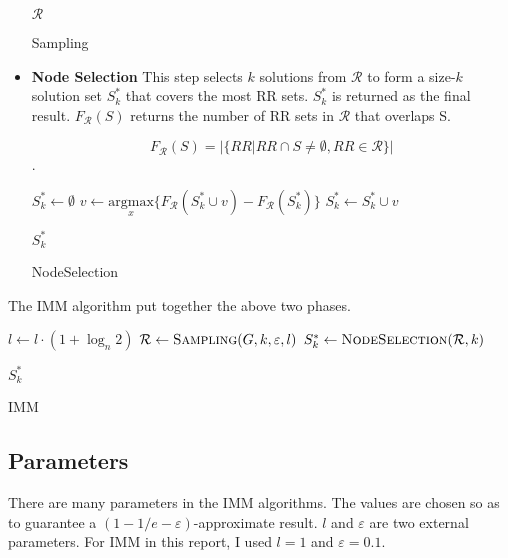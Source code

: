 \documentclass[conference]{IEEEtran}
\begin{document}
\begin{itemize}
\begin{algorithm}[H]
\begin{algorithmic}[1]
            \Return $\mathcal{R}$
            \EndFunction
            \end{algorithmic}
            \caption{Sampling}
        \end{algorithm}

        \item \textbf{Node Selection}
        This step selects $k$ solutions from $\mathcal{R}$ to form a size-$k$ solution set $S_{k}^*$ that covers the most RR sets. $S_{k}^*$ is returned as the final result. $F_{\mathcal{R}}(S)$ returns the number of RR sets in $\mathcal{R}$ that overlaps S. 
        
        $$F_{\mathcal{R}}(S) = \vert \{ RR|RR \cap S \neq \emptyset, RR \in \mathcal{R}\} \vert $$.
        
        \begin{algorithm}[H]
            \begin{algorithmic}[1]
            \State $S_k^{*} \gets \emptyset$
                \State $v \gets \underset{x}{\mathrm{argmax}} \{F_{\mathcal{R}}(S_k^* \cup v)-F_{\mathcal{R}}(S_k^*)\}$
                \State $S_k^* \gets S_k^* \cup v$
            \EndFor
            


            \Return $S_k^*$
            \EndFunction
            \end{algorithmic}
            \caption{NodeSelection}
        \end{algorithm}
    \end{itemize}

    The IMM algorithm put together the above two phases.

    \begin{algorithm}[H]
        \begin{algorithmic}[1]
        \State $l \gets l \cdot (1+\log_n 2)$
        \State $\mathcal{R} \gets \Call{Sampling}{G,k,\varepsilon,l}$
        \State $S_k^* \gets \Call{NodeSelection}{\mathcal{R},k}$

        \Return $S_k^*$
        \EndFunction
        \end{algorithmic}
        \caption{IMM}
    \end{algorithm}
\subsection{Parameters}
There are many parameters in the IMM algorithms. The values are chosen so as to guarantee a $(1-1/e-\varepsilon)$-approximate result. $l$ and $\varepsilon$ are two external parameters. For IMM in this report, I used $l = 1$ and $\varepsilon = 0.1$.
\end{document}
